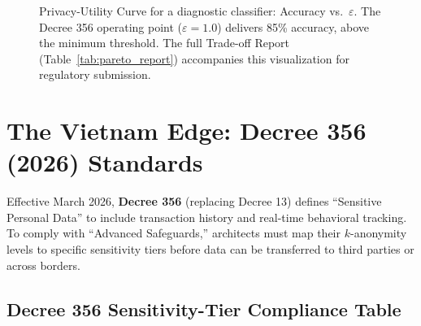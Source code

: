 \begin{figure}[ht]
\centering
{}
\caption{Privacy-Utility Curve for a diagnostic classifier: Accuracy vs.\ $\varepsilon$. The Decree 356 operating point ($\varepsilon=1.0$) delivers 85\% accuracy, above the minimum threshold. The full Trade-off Report (Table~\ref{tab:pareto_report}) accompanies this visualization for regulatory submission.}
\label{fig:pareto_curve}
\end{figure}

\section{The Vietnam Edge: Decree 356 (2026) Standards}
\label{sec:vietnam_decree_356}

Effective March 2026, \textbf{Decree 356} (replacing Decree 13) defines ``Sensitive Personal Data'' to include transaction history and real-time behavioral tracking. To comply with ``Advanced Safeguards,'' architects must map their $k$-anonymity levels to specific sensitivity tiers before data can be transferred to third parties or across borders.

\subsection{Decree 356 Sensitivity-Tier Compliance Table}
\label{subsec:decree356_compliance}

